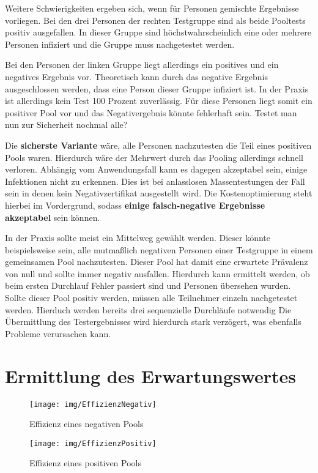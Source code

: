 Weitere Schwierigkeiten ergeben sich, wenn für Personen gemischte Ergebnisse vorliegen.
Bei den drei Personen der rechten Testgruppe sind als beide Pooltests positiv ausgefallen.
In dieser Gruppe sind höchstwahrscheinlich eine oder mehrere Personen infiziert und die Gruppe muss nachgetestet werden.

Bei den Personen der linken Gruppe liegt allerdings ein positives und ein negatives Ergebnis vor.
Theoretisch kann durch das negative Ergebnis ausgeschlossen werden, dass eine Person dieser Gruppe infiziert ist.
In der Praxis ist allerdings kein Test 100 Prozent zuverlässig.
Für diese Personen liegt somit ein positiver Pool vor und das Negativergebnis könnte fehlerhaft sein.
Testet man nun zur Sicherheit nochmal alle?

Die \textbf{sicherste Variante} wäre, alle Personen nachzutesten die Teil eines positiven Pools waren.
Hierdurch wäre der Mehrwert durch das Pooling allerdings schnell verloren.
Abhängig vom Anwendungsfall kann es dagegen akzeptabel sein, einige Infektionen nicht zu erkennen.
Dies ist bei anlasslosen Massentestungen der Fall sein in denen kein Negativzertifikat ausgestellt wird.
Die Kostenoptimierung steht hierbei im Vordergrund, sodass \textbf{einige falsch-negative Ergebnisse akzeptabel} sein können. 

In der Praxis sollte meist ein Mittelweg gewählt werden.
Dieser könnte beispielsweise sein, alle mutmaßlich negativen Personen einer Testgruppe in einem gemeinsamen Pool nachzutesten.
Dieser Pool hat damit eine erwartete Prävalenz von null und sollte immer negativ ausfallen.
Hierdurch kann ermittelt werden, ob beim ersten Durchlauf Fehler passiert sind und Personen übersehen wurden.
Sollte dieser Pool positiv werden, müssen alle Teilnehmer einzeln nachgetestet werden.
Hierduch werden bereits drei sequenzielle Durchläufe notwendig
Die Übermittlung des Testergebnisses wird hierdurch stark verzögert, was ebenfalls Probleme verursachen kann.

\section{Ermittlung des Erwartungswertes}
\begin{wrapfigure}{r}{0.4\textwidth}
	\texttt{[image: img/EffizienzNegativ]}
	\caption{Effizienz eines \newline negativen Pools}
	
	\texttt{[image: img/EffizienzPositiv]}
	\caption{Effizienz eines \newline positiven Pools}
\end{wrapfigure}

